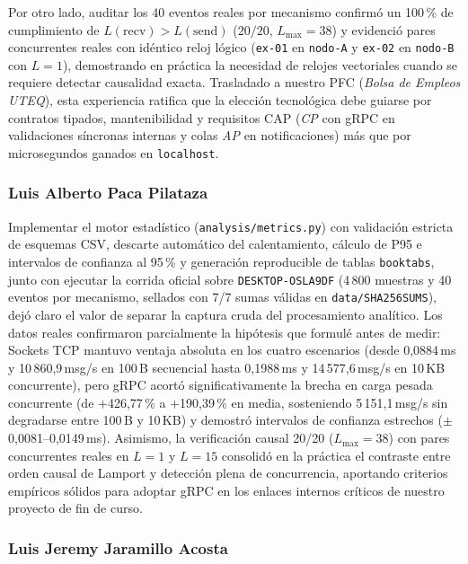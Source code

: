 \documentclass[12pt,a4paper]{article}
\begin{document}
Por otro lado, auditar los 40 eventos reales por mecanismo confirmó un 100\,\% de cumplimiento de $L(\mathrm{recv}) > L(\mathrm{send})$ ($20/20$, $L_{\max}=38$) y evidenció pares concurrentes reales con idéntico reloj lógico (\texttt{ex-01} en \texttt{nodo-A} y \texttt{ex-02} en \texttt{nodo-B} con $L=1$), demostrando en práctica la necesidad de relojes vectoriales cuando se requiere detectar causalidad exacta. Trasladado a nuestro PFC (\emph{Bolsa de Empleos UTEQ}), esta experiencia ratifica que la elección tecnológica debe guiarse por contratos tipados, mantenibilidad y requisitos CAP (\emph{CP} con gRPC en validaciones síncronas internas y colas \emph{AP} en notificaciones) más que por microsegundos ganados en \texttt{localhost}.

\subsubsection*{Luis Alberto Paca Pilataza}

Implementar el motor estadístico (\texttt{analysis/metrics.py}) con validación estricta de esquemas CSV, descarte automático del calentamiento, cálculo de P95 e intervalos de confianza al 95\,\% y generación reproducible de tablas \texttt{booktabs}, junto con ejecutar la corrida oficial sobre \texttt{DESKTOP-OSLA9DF} (4\,800 muestras y 40 eventos por mecanismo, sellados con 7/7 sumas válidas en \texttt{data/SHA256SUMS}), dejó claro el valor de separar la captura cruda del procesamiento analítico. Los datos reales confirmaron parcialmente la hipótesis que formulé antes de medir: Sockets TCP mantuvo ventaja absoluta en los cuatro escenarios (desde 0,0884\,ms y 10\,860,9\,msg/s en 100\,B secuencial hasta 0,1988\,ms y 14\,577,6\,msg/s en 10\,KB concurrente), pero gRPC acortó significativamente la brecha en carga pesada concurrente (de $+$426,77\,\% a $+$190,39\,\% en media, sosteniendo 5\,151,1\,msg/s sin degradarse entre 100\,B y 10\,KB) y demostró intervalos de confianza estrechos ($\pm$0,0081--0,0149\,ms). Asimismo, la verificación causal 20/20 ($L_{\max}=38$) con pares concurrentes reales en $L=1$ y $L=15$ consolidó en la práctica el contraste entre orden causal de Lamport y detección plena de concurrencia, aportando criterios empíricos sólidos para adoptar gRPC en los enlaces internos críticos de nuestro proyecto de fin de curso.

\subsubsection*{Luis Jeremy Jaramillo Acosta}
\end{document}
